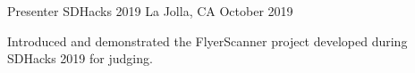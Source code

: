 \begin{cventries}

  \cventry
    {Presenter} %
    {SDHacks 2019} %
    {La Jolla, CA} %
    {October 2019} %
    {
      \begin{cvitems} %
        \item {Introduced and demonstrated the FlyerScanner project developed during SDHacks 2019 for judging.}
      \end{cvitems}
    }
\end{cventries}